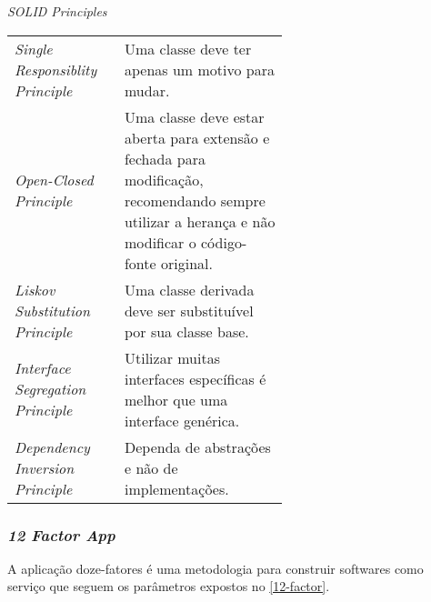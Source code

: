 \begin{quadro}[H]
	\caption{\textit{SOLID Principles}}
	\centering
	\begin{tabular}{| l | p{0.6\linewidth}|}
		\hline
		\thead[l]{Princípio} & \thead[l]{Descrição}\\
		\hline
		\textit{Single Responsiblity Principle} 	& Uma classe deve ter apenas um motivo para mudar.\\
		\hline
		\textit{Open-Closed Principle}				& Uma classe deve estar aberta para extensão e fechada para modificação, recomendando sempre utilizar a herança e não modificar o código-fonte original.\\
		\hline
		\textit{Liskov Substitution Principle}		& Uma classe derivada deve ser substituível por sua classe base.\\
		\hline
		\textit{Interface Segregation Principle}	& Utilizar muitas interfaces específicas é melhor que uma interface genérica.\\
		\hline
		\textit{Dependency Inversion Principle}		& Dependa de abstrações e não de implementações. \\
		\hline
	\end{tabular}
	\label{solid}
\end{quadro}

\subsubsection{\textit{12 Factor App}}

A aplicação doze-fatores é uma metodologia para construir softwares como serviço que seguem os parâmetros expostos no \autoref{12-factor}.


